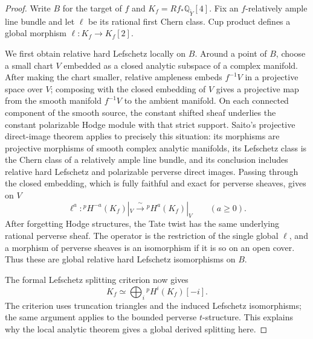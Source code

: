 \documentclass[11pt]{amsart}
\theoremstyle{definition}
\theoremstyle{remark}
\numberwithin{equation}{section}
\newcommand{\Q}{\mathbb{Q}}
\begin{document}
\begin{proof}
Write $B$ for the target of $f$ and
$K_f=Rf_*\Q_{\widetilde Y}[4]$.  Fix an $f$-relatively ample line
bundle and let $\ell$ be its rational first Chern class.  Cup product
defines a global morphism $\ell\colon K_f\to K_f[2]$.

We first obtain relative hard Lefschetz locally on $B$.  Around a
point of $B$, choose a small chart $V$ embedded as a closed analytic
subspace of a complex manifold.  After making the chart smaller,
relative ampleness embeds $f^{-1}V$ in a projective space over $V$;
composing with the closed embedding of $V$ gives a projective map
from the smooth manifold $f^{-1}V$ to the ambient manifold.  On each
connected component of the smooth source, the constant shifted sheaf
underlies the constant polarizable Hodge module with that strict
support.  Saito's projective direct-image theorem
\cite[Theorem~5.3.1]{SaitoMHP} applies to precisely this situation:
its morphisms are projective morphisms of smooth complex analytic
manifolds, its Lefschetz class is the Chern class of a relatively ample
line bundle, and its conclusion includes relative hard Lefschetz and
polarizable perverse direct images.  Passing through the closed
embedding, which is fully faithful and exact for perverse sheaves,
gives on $V$
\[
 \ell^a\colon {}^p\!H^{-a}(K_f)|_V
            \xrightarrow{\ \sim\ }{}^p\!H^a(K_f)|_V
 \qquad(a\geq0).
\]
After forgetting Hodge structures, the Tate twist has the same
underlying rational perverse sheaf.  The operator is the restriction of the single
global $\ell$, and a morphism of perverse sheaves is an isomorphism
if it is so on an open cover.  Thus these are global relative hard
Lefschetz isomorphisms on $B$.

The formal Lefschetz splitting criterion
\cite[Theorem~1.5]{DeligneLefschetz} now gives
\begin{equation}\label{eq:branch-perverse-splitting}
 K_f\simeq\bigoplus_i{}^p\!H^i(K_f)[-i].
\end{equation}
The criterion uses truncation triangles and the induced Lefschetz
isomorphisms; the same argument applies to the bounded perverse
$t$-structure.  This explains why the local analytic theorem gives a
global derived splitting here.


\end{proof}
\end{document}
